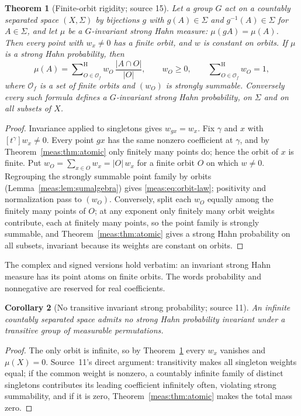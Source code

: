 \documentclass[11pt]{article}
\numberwithin{equation}{section}
\newtheorem{theorem}{Theorem}[section]
\newtheorem{corollary}[theorem]{Corollary}
\theoremstyle{definition}
\theoremstyle{remark}
\newcommand{\coef}[2]{[t^{#1}]#2}
\newcommand{\hsum}{\mathop{\sum}\nolimits^{\mathrm H}}
\newcommand{\abs}[1]{\lvert#1\rvert}
\begin{document}
\begin{theorem}[Finite-orbit rigidity; source 15]\label{meas:thm:orbits}
Let a group $G$ act on a countably separated space $(X,\Sigma)$ by bijections
$g$ with $g(A)\in\Sigma$ and $g^{-1}(A)\in\Sigma$ for $A\in\Sigma$, and let $\mu$
be a $G$-invariant strong Hahn measure: $\mu(gA)=\mu(A)$. Then every point with
$w_x\ne0$ has a finite orbit, and $w$ is constant on orbits. If $\mu$ is a
strong Hahn probability, then
\begin{equation}\label{meas:eq:orbit-law}
 \mu(A)=\hsum_{O\in\mathcal O_f}w_O\,\frac{\abs{A\cap O}}{\abs O},
 \qquad w_O\ge0,\qquad\hsum_{O\in\mathcal O_f}w_O=1,
\end{equation}
where $\mathcal O_f$ is a set of finite orbits and $(w_O)$ is strongly summable.
Conversely every such formula defines a $G$-invariant strong Hahn probability,
on $\Sigma$ and on all subsets of $X$.
\end{theorem}
\begin{proof}
Invariance applied to singletons gives $w_{gx}=w_x$. Fix $\gamma$ and $x$ with
$\coef{\gamma}{w_x}\ne0$. Every point $gx$ has the same nonzero coefficient at
$\gamma$, and by Theorem~\ref{meas:thm:atomic} only finitely many points do;
hence the orbit of $x$ is finite. Put $w_O=\sum_{x\in O}w_x=\abs O\,w_x$ for a
finite orbit $O$ on which $w\ne0$. Regrouping the strongly summable point
family by orbits (Lemma~\ref{meas:lem:sumalgebra}) gives
\eqref{meas:eq:orbit-law}; positivity and normalization pass to $(w_O)$.
Conversely, split each $w_O$ equally among the finitely many points of $O$; at
any exponent only finitely many orbit weights contribute, each at finitely
many points, so the point family is strongly summable, and
Theorem~\ref{meas:thm:atomic} gives a strong Hahn probability on all subsets,
invariant because its weights are constant on orbits.
\end{proof}

The complex and signed versions hold verbatim: an invariant strong Hahn
measure has its point atoms on finite orbits. The words probability and
nonnegative are reserved for real coefficients.

\begin{corollary}[No transitive invariant strong probability; source 11]
\label{meas:cor:transitive}
An infinite countably separated space admits no strong Hahn probability
invariant under a transitive group of measurable permutations.
\end{corollary}
\begin{proof}
The only orbit is infinite, so by Theorem~\ref{meas:thm:orbits} every $w_x$
vanishes and $\mu(X)=0$. Source~11's direct argument: transitivity makes all
singleton weights equal; if the common weight is nonzero, a countably infinite
family of distinct singletons contributes its leading coefficient infinitely
often, violating strong summability, and if it is zero,
Theorem~\ref{meas:thm:atomic} makes the total mass zero.
\end{proof}
\end{document}

